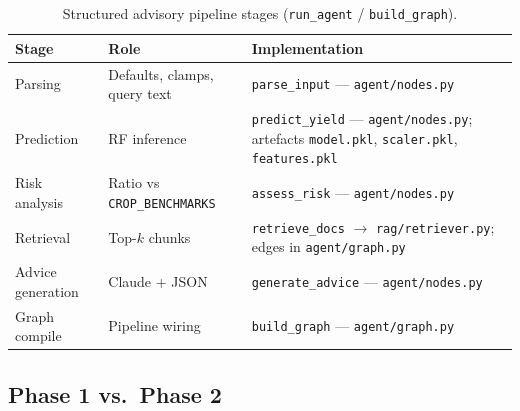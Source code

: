 \documentclass[12pt,a4paper]{article}
\begin{document}
\begin{table}[H]
\centering
\caption{Structured advisory pipeline stages (\texttt{run\_agent} / \texttt{build\_graph}).}
\label{tab:phase2-pipeline-stages}
\renewcommand{\arraystretch}{1.25}
\begin{tabularx}{\textwidth}{L{2.6cm} X L{4.2cm}}
\toprule
{}
\color{white}\textbf{Stage} &
\color{white}\textbf{Role} &
\color{white}\textbf{Implementation} \\
\midrule
{}
Parsing &
Defaults, clamps, query text &
\texttt{parse\_input} --- \texttt{agent/nodes.py} \\
Prediction &
RF inference &
\texttt{predict\_yield} --- \texttt{agent/nodes.py}; artefacts \texttt{model.pkl}, \texttt{scaler.pkl}, \texttt{features.pkl} \\
Risk analysis &
Ratio vs \texttt{CROP\_BENCHMARKS} &
\texttt{assess\_risk} --- \texttt{agent/nodes.py} \\
Retrieval &
Top-$k$ chunks &
\texttt{retrieve\_docs} $\rightarrow$ \texttt{rag/retriever.py}; edges in \texttt{agent/graph.py} \\
Advice generation &
Claude + JSON &
\texttt{generate\_advice} --- \texttt{agent/nodes.py} \\
Graph compile &
Pipeline wiring &
\texttt{build\_graph} --- \texttt{agent/graph.py} \\
\bottomrule
\end{tabularx}
\end{table}

\subsection{Phase 1 vs.\ Phase 2}
\end{document}
